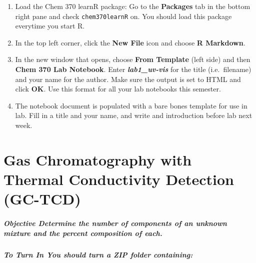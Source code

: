 \documentclass[]{tufte-book}
\providecommand{\tightlist}{%
  \setlength{\itemsep}{0pt}\setlength{\parskip}{0pt}}
\begin{document}
\begin{enumerate}
\def\labelenumi{\arabic{enumi}.}
\tightlist
\item
  Load the Chem 370 learnR package: Go to the \textbf{Packages} tab in the bottom right pane and check \texttt{chem370learnR} on. You should load this package everytime you start R.
\item
  In the top left corner, click the \textbf{New File} icon and choose \textbf{R Markdown}.
\item
  In the new window that opens, choose \textbf{From Template} (left side) and then \textbf{Chem 370 Lab Notebook}. Enter \textbf{\emph{lab1\_uv-vis}} for the title (i.e.~filename) and your name for the author. Make sure the output is set to HTML and click \textbf{OK}. Use this format for all your lab notebooks this semester.
\item
  The notebook document is populated with a bare bones template for use in lab. Fill in a title and your name, and write and introduction before lab next week.
\end{enumerate}

\hypertarget{gas-chromatography-with-thermal-conductivity-detection-gc-tcd}{%
\chapter{Gas Chromatography with Thermal Conductivity Detection (GC-TCD)}\label{gas-chromatography-with-thermal-conductivity-detection-gc-tcd}}

\hypertarget{objective-determine-the-number-of-components-of-an-unknown-mixture-and-the-percent-composition-of-each.}{%
\paragraph{\texorpdfstring{\textbf{Objective} \textbar{} Determine the number of components of an unknown mixture and the percent composition of each.}{Objective \textbar{} Determine the number of components of an unknown mixture and the percent composition of each.}}\label{objective-determine-the-number-of-components-of-an-unknown-mixture-and-the-percent-composition-of-each.}}

\hypertarget{to-turn-in-you-should-turn-a-zip-folder-containing}{%
\paragraph{\texorpdfstring{\textbf{To Turn In} \textbar{} \emph{You should turn a ZIP folder containing:}}{To Turn In \textbar{} You should turn a ZIP folder containing:}}\label{to-turn-in-you-should-turn-a-zip-folder-containing}}
\end{document}

